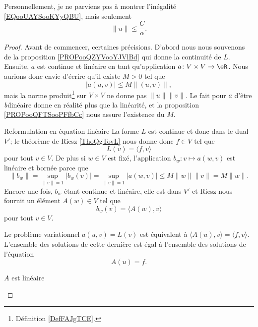\begin{probleme}
    Personnellement, je ne parviens pas à montrer l'inégalité \eqref{EQooUAYSooKYyQBU}, mais seulement
    \begin{equation}
        \| u \|\leq \frac{ C }{ \alpha }.
    \end{equation}
\end{probleme}

\begin{proof}
    Avant de commencer, certaines précisions. D'abord nous nous souvenons de la proposition \ref{PROPooQZYVooYJVlBd} qui donne la continuité de \( L\). Ensuite, \( a\) est continue et linéaire en tant qu'application \( a\colon V\times V\to \eR\). Nous aurions donc envie d'écrire qu'il existe \( M>0\) tel que
    \begin{equation}
        | a(u,v) |\leq M\| (u,v) \|,
    \end{equation}
    mais la norme produit\footnote{Définition \ref{DefFAJgTCE}.} sur \( V\times V\) ne donne pas \( \| u \|\| v \|\). Le fait pour \( a\) d'être \emph{bi}linéaire donne en réalité plus que la linéarité, et la proposition \ref{PROPooQFTSooPFfbCc} nous assure l'existence du \( M\).

    \begin{subproof}
        \item[Reformulation en équation linéaire]
            La forme \( L\) est continue et donc dans le dual \( V'\); le théorème de Riesz \ref{ThoQgTovL} nous donne donc \( f\in V\) tel que
            \begin{equation}
                L(v)=\langle f, v\rangle 
            \end{equation}
            pour tout \( v\in V\). De plus si \( w\in V\) est fixé, l'application \( b_w\colon v\mapsto a(w,v)\) est linéaire et bornée parce que
            \begin{equation}
                \| b_w \|=\sup_{\| v \|=1}| b_w(v) |=\sup_{\| v \|=1}| a(w,v) |\leq M\| w \|\| v \|=M\| w \|.   
            \end{equation}
            Encore une fois, \( b_w\) étant continue et linéaire, elle est dans \( V'\) et Riesz nous fournit un élément \( A(w)\in V\) tel que
            \begin{equation}
                b_w(v)=\langle A(w), v\rangle 
            \end{equation}
            pour tout \( v\in V\). 

            Le problème variationnel \( a(u,v)=L(v)\) est équivalent à \( \langle A(u), v\rangle =\langle f, v\rangle \). L'ensemble des solutions de cette dernière est égal à l'ensemble des solutions de l'équation
            \begin{equation}        \label{EQooLPMPooMVuYUX}
                A(u)=f.
            \end{equation}
        \item[\( A\) est linéaire]


\end{subproof}
\end{proof}

